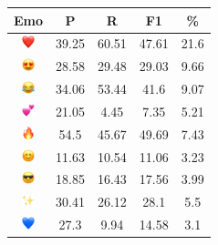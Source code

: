\documentclass{article}
\begin{document}
\begin{table}
\centering
\begin{tabular}{|c|ccc|c|} \hline
\textbf{Emo} & \textbf{P} & \textbf{R} & \textbf{F1} & \textbf{\%} \\ \hline
\includegraphics[height=0.37cm,width=0.37cm]{img/red_heart.png} & 39.25 & 60.51 & 47.61 & 21.6\\ 
\includegraphics[height=0.37cm,width=0.37cm]{img/smiling_face_with_hearteyes.png} & 28.58 & 29.48 & 29.03 & 9.66\\ 
\includegraphics[height=0.37cm,width=0.37cm]{img/face_with_tears_of_joy.png} & 34.06 & 53.44 & 41.6 & 9.07\\ 
\includegraphics[height=0.37cm,width=0.37cm]{img/two_hearts.png} & 21.05 & 4.45 & 7.35 & 5.21\\ 
\includegraphics[height=0.37cm,width=0.37cm]{img/fire.png} & 54.5 & 45.67 & 49.69 & 7.43\\ 
\includegraphics[height=0.37cm,width=0.37cm]{img/smiling_face_with_smiling_eyes.png} & 11.63 & 10.54 & 11.06 & 3.23\\ 
\includegraphics[height=0.37cm,width=0.37cm]{img/smiling_face_with_sunglasses.png} & 18.85 & 16.43 & 17.56 & 3.99\\ 
\includegraphics[height=0.37cm,width=0.37cm]{img/sparkles.png} & 30.41 & 26.12 & 28.1 & 5.5\\ 
\includegraphics[height=0.37cm,width=0.37cm]{img/blue_heart.png} & 27.3 & 9.94 & 14.58 & 3.1\\ 

\end{tabular}
\end{table}
\end{document}
